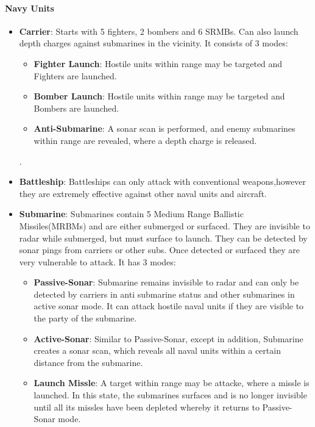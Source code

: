         \paragraph{Navy Units}
        \begin{itemize}
         \item \textbf{Carrier}: Starts with 5 fighters, 2 bombers and 6 SRMBs. Can also launch depth charges against submarines in the vicinity. It consists of 3 modes:
            \begin{itemize}
               \item \textbf{Fighter Launch}: Hostile units within range may be targeted and Fighters are launched.
               \item \textbf{Bomber Launch}:  Hostile units within range may be targeted and Bombers are launched.
               \item \textbf{Anti-Submarine}: A sonar scan is performed, and enemy submarines within range are revealed, where a depth charge is released. 
            \end{itemize}.  
         \item \textbf{Battleship}: Battleships can only attack with conventional weapons,however they are extremely effective against other naval units and aircraft.
         \item \textbf{Submarine}: Submarines contain 5 Medium Range Ballistic Missiles(MRBMs) and are either submerged or surfaced. They are invisible to radar while submerged, but must surface to launch. They can be detected by sonar pings from carriers or other subs. Once detected or surfaced they are very vulnerable to attack. It has 3 modes:
            \begin{itemize}
               \item \textbf{Passive-Sonar}: Submarine remains invisible to radar and can only be detected by carriers in anti submarine status and other submarines in active sonar mode. It can attack hostile naval units if they are visible to the party of the submarine.

               \item \textbf{Active-Sonar}: Similar to Passive-Sonar, except in addition, Submarine creates a sonar scan, which reveals all naval units within a certain distance from the submarine. 

               \item \textbf{Launch Missle}: A target within range may be attacke, where a missle is launched. In this state, the submarines surfaces and is no longer invisible until all its missles have been depleted whereby it returns to Passive-Sonar mode.
            \end{itemize}
         \end{itemize}
        
